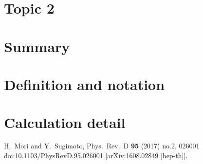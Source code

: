 \documentclass[11pt]{article}
\numberwithin{equation}{section}
\begin{document}
\section{Topic 2}



\section{Summary}





\appendix
\section{Definition and notation}



\section{Calculation detail}





%
%
%
\providecommand{\href}[2]{#2}\begingroup\raggedright\begin{thebibliography}{10}

  H.~Mori and Y.~Sugimoto,
  Phys.\ Rev.\ D {\bf 95} (2017) no.2,  026001
  doi:10.1103/PhysRevD.95.026001
  [arXiv:1608.02849 [hep-th]].

\end{thebibliography}\endgroup
\end{document}
